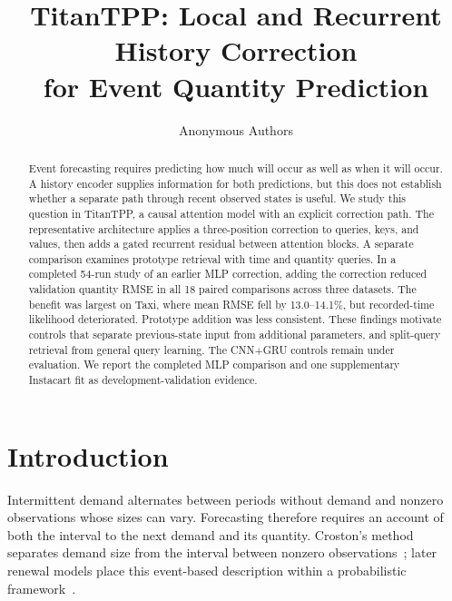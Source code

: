 \documentclass[runningheads]{llncs}
\begin{document}
\title{TitanTPP: Local and Recurrent History Correction\texorpdfstring{\\}{ }for Event Quantity Prediction}
\author{Anonymous Authors}
\maketitle

\begin{abstract}
Event forecasting requires predicting how much will occur as well as when it will occur. A history encoder supplies information for both predictions, but this does not establish whether a separate path through recent observed states is useful. We study this question in TitanTPP, a causal attention model with an explicit correction path. The representative architecture applies a three-position correction to queries, keys, and values, then adds a gated recurrent residual between attention blocks. A separate comparison examines prototype retrieval with time and quantity queries. In a completed 54-run study of an earlier MLP correction, adding the correction reduced validation quantity RMSE in all 18 paired comparisons across three datasets. The benefit was largest on Taxi, where mean RMSE fell by 13.0--14.1\%, but recorded-time likelihood deteriorated. Prototype addition was less consistent. These findings motivate controls that separate previous-state input from additional parameters, and split-query retrieval from general query learning. The CNN+GRU controls remain under evaluation. We report the completed MLP comparison and one supplementary Instacart fit as development-validation evidence.
\end{abstract}

\section{Introduction}
Intermittent demand alternates between periods without demand and nonzero observations whose sizes can vary. Forecasting therefore requires an account of both the interval to the next demand and its quantity. Croston's method separates demand size from the interval between nonzero observations~\cite{croston1972forecasting}; later renewal models place this event-based description within a probabilistic framework~\cite{turkmen2021renewal}.
\end{document}
